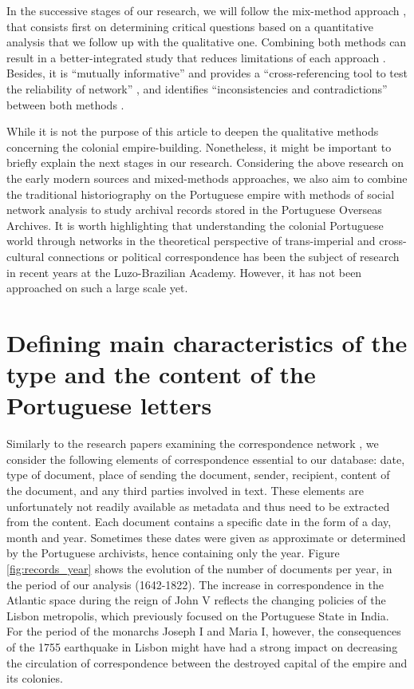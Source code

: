 \documentclass{article}
\begin{document}
In the successive stages of our research, we will follow the mix-method approach \cite{martinez_combining_2003,dominguez_mixed_2014}, that consists first on determining critical questions based on a quantitative analysis that we follow up with the qualitative one. Combining both methods can result in a better-integrated study that reduces limitations of each approach \cite{crossley_social_2010}. Besides, it is “mutually informative” and provides a “cross-referencing tool to test the reliability of network” \cite{edwards_mixed-method_2010}, and identifies “inconsistencies and contradictions” between both methods \cite{padgett_economic_2011}. 

While it is not the purpose of this article to deepen the qualitative methods concerning the colonial empire-building. Nonetheless, it might be important to briefly explain the next stages in our research. Considering the above research on the early modern sources and mixed-methods approaches, we also aim to combine the traditional historiography on the Portuguese empire with methods of social network analysis to study archival records stored in the Portuguese Overseas Archives.  It is worth highlighting that understanding the colonial Portuguese world through networks in the theoretical perspective of trans-imperial and cross-cultural connections \cite{ribeiro_da_silva_trans-imperial_2018} or political correspondence \cite{fragoso_um_2017} has been the subject of research in recent years at the Luzo-Brazilian Academy. However, it has not been approached on such a large scale yet.

\section{Defining main characteristics of the type and the content of the Portuguese letters}

Similarly to the research papers examining the correspondence network \cite{mcshane_visualising_2018,ahnert_protestant_2015}, we consider the following elements of correspondence essential to our database: date, type of document, place of sending the document, sender, recipient, content of the document, and any third parties involved in text. These elements are unfortunately not readily available as metadata and thus need to be extracted from the content. Each document contains a specific date in the form of a day, month and year. Sometimes these dates were given as approximate or determined by the Portuguese archivists, hence containing only the year. Figure \ref{fig:records_year} shows the evolution of the number of documents per year, in the period of our analysis (1642-1822). The increase in correspondence in the Atlantic space during the reign of John V reflects the changing policies of the Lisbon metropolis, which previously focused on the Portuguese State in India. For the period of the monarchs Joseph I and Maria I, however, the consequences of the 1755 earthquake in Lisbon might have had a strong impact on decreasing the circulation of correspondence between the destroyed capital of the empire and its colonies.
\end{document}
